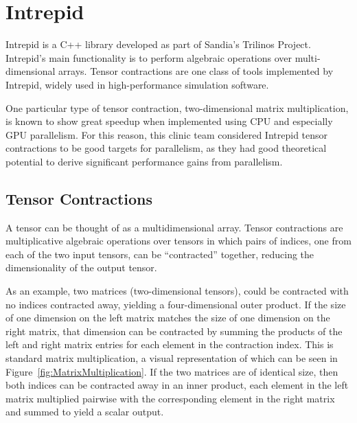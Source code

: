 \chapter{Intrepid} \label{sec:IntroIntrepid}
Intrepid is a C++ library developed as part of Sandia's Trilinos Project.
Intrepid's main functionality is to perform algebraic operations over 
multi-dimensional arrays. Tensor
contractions are one class of tools implemented by Intrepid, widely used in
high-performance simulation software.

One particular type of tensor contraction, two-dimensional matrix
multiplication, is known to show great speedup when implemented using CPU and
especially GPU parallelism. For this reason, this clinic team considered
Intrepid tensor contractions to be good targets for parallelism, as they 
had good theoretical potential to derive
significant performance gains from parallelism.

\section{Tensor Contractions}
A tensor can be thought of as a multidimensional array. Tensor contractions are
multiplicative algebraic operations over tensors in which pairs of indices, one from each of
the two input tensors, can be ``contracted'' together, reducing the dimensionality
of the output tensor. 

As an example, two matrices (two-dimensional tensors), could be contracted with no indices
contracted away, yielding a four-dimensional outer product. If the size of one
dimension on the left matrix matches the size of one dimension on the right
matrix, that dimension can be contracted by summing the products of the left and
right matrix entries for each element in the contraction index. This is
standard matrix multiplication, a visual representation of which can be seen in
Figure~\ref{fig:MatrixMultiplication}. If the two matrices are of identical
size, then both indices can be contracted away in an inner product, each element
in the left matrix multiplied pairwise with the corresponding element in the
right matrix and summed to yield a scalar output.

